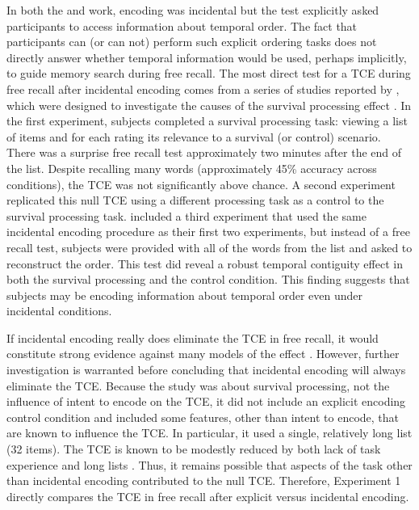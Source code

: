 \documentclass[man,natbib,floatsintext]{apa6} %
\begin{document}
\label{TODO-4}
In both the \citet{BradGlen83,GlenBrad79} and \citet{Nair91, Nair90b} work, encoding was incidental but the test explicitly asked participants to access information about temporal order. The fact that participants can (or can not) perform such explicit ordering tasks does not directly answer whether temporal information would be used, perhaps implicitly, to guide memory search during free recall. The most direct test for a TCE during free recall after incidental encoding comes from a series of studies reported by \citet{NairEtal17}, which were designed to investigate the causes of the survival processing effect \citep{NairEtal07}. In the first experiment, subjects completed a survival processing task: viewing a list of items and for each rating its relevance to a survival (or control) scenario. There was a surprise free recall test approximately two minutes after the end of the list. Despite recalling many words (approximately 45\% accuracy across conditions), the TCE was not significantly above chance. A second experiment replicated this null TCE using a different processing task as a control to the survival processing task. \citet{NairEtal17} included a third experiment that used the same incidental encoding procedure as their first two experiments, but instead of a free recall test, subjects were provided with all of the words from the list and asked to reconstruct the order. This test did reveal a robust temporal contiguity effect in both the survival processing and the control condition. This finding suggests that subjects may be encoding information about temporal order even under incidental conditions. 

If incidental encoding really does eliminate the TCE in free recall, it would constitute strong evidence against many models of the effect \citep[e.g.,][]{LohnEtal14,HealKaha16}. However, further investigation is warranted before concluding that incidental encoding will always eliminate the TCE. Because the \citep{NairEtal17} study was about survival processing, not the influence of intent to encode on the TCE, it did not include an explicit encoding control condition and included some features, other than intent to encode, that are known to influence the TCE. In particular, it used a single, relatively long list (32 items). The TCE is known to be modestly reduced by both lack of task experience and long lists \citep{HealKaha17}.
Thus, it remains possible that aspects of the task other than incidental encoding contributed to the null TCE. Therefore, Experiment 1 directly compares the TCE in \label{TODO-3} free recall after explicit versus incidental encoding.
\color{black}
\end{document}
